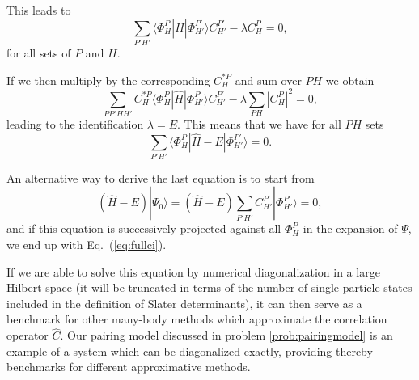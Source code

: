   This leads to
  \[
  \sum_{P'H'}\langle \Phi_H^P | \hat{H} |\Phi_{H'}^{P'} \rangle
  C_{H'}^{P'}-\lambda C_H^{P}=0,
  \]
  for all sets of $P$ and $H$.

  If we then multiply by the corresponding $C_H^{*P}$ and sum over
  $PH$ we obtain
  \[ 
  \sum_{PP'HH'}C_H^{*P}\langle \Phi_H^P | \hat{H} |\Phi_{H'}^{P'}
  \rangle C_{H'}^{P'}-\lambda\sum_{PH}|C_H^P|^2=0,
  \]
  leading to the identification $\lambda = E$. This means that we have
  for all $PH$ sets
  \begin{equation}
  \sum_{P'H'}\langle \Phi_H^P | \hat{H} -E|\Phi_{H'}^{P'} \rangle =
  0. \label{eq:fullci}
  \end{equation}



  An alternative way to derive the last equation is to start from
  \[
  (\hat{H} -E)|\Psi_0\rangle = (\hat{H}
  -E)\sum_{P'H'}C_{H'}^{P'}|\Phi_{H'}^{P'} \rangle=0,
  \]
  and if this equation is successively projected against all
  $\Phi_H^P$ in the expansion of $\Psi$, we end up with
  Eq.~(\ref{eq:fullci}).

  If we are able to solve this equation by numerical diagonalization in
  a large Hilbert space (it will be truncated in terms of the number
  of single-particle states included in the definition of Slater
  determinants), it can then serve as a benchmark for other many-body
  methods which approximate the correlation operator $\hat{C}$.  Our
  pairing model discussed in problem \ref{prob:pairingmodel} is an
  example of a system which can be diagonalized exactly, providing
  thereby benchmarks for different approximative methods.


